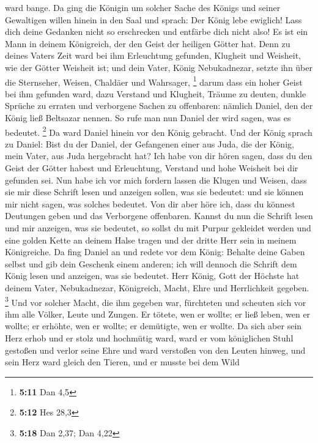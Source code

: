 ward bange.  Da ging die Königin um solcher Sache des
Königs und seiner Gewaltigen willen hinein in den Saal und sprach: Der
König lebe ewiglich! Lass dich deine Gedanken nicht so erschrecken und
entfärbe dich nicht also!  Es ist ein Mann in deinem
Königreich, der den Geist der heiligen Götter hat. Denn zu deines Vaters
Zeit ward bei ihm Erleuchtung gefunden, Klugheit und Weisheit, wie der
Götter Weisheit ist; und dein Vater, König Nebukadnezar, setzte ihn über
die Sternseher, Weisen, Chaldäer und Wahrsager, \footnote{\textbf{5:11}
  Dan 4,5}  darum dass ein hoher Geist bei ihm gefunden
ward, dazu Verstand und Klugheit, Träume zu deuten, dunkle Sprüche zu
erraten und verborgene Sachen zu offenbaren: nämlich Daniel, den der
König ließ Beltsazar nennen. So rufe man nun Daniel der wird sagen, was
es bedeutet. \footnote{\textbf{5:12} Hes 28,3}  Da ward
Daniel hinein vor den König gebracht. Und der König sprach zu Daniel:
Bist du der Daniel, der Gefangenen einer aus Juda, die der König, mein
Vater, aus Juda hergebracht hat?  Ich habe von dir hören
sagen, dass du den Geist der Götter habest und Erleuchtung, Verstand und
hohe Weisheit bei dir gefunden sei.  Nun habe ich vor
mich fordern lassen die Klugen und Weisen, dass sie mir diese Schrift
lesen und anzeigen sollen, was sie bedeutet: und sie können mir nicht
sagen, was solches bedeutet.  Von dir aber höre ich, dass
du könnest Deutungen geben und das Verborgene offenbaren. Kannst du nun
die Schrift lesen und mir anzeigen, was sie bedeutet, so sollst du mit
Purpur gekleidet werden und eine golden Kette an deinem Halse tragen und
der dritte Herr sein in meinem Königreiche.  Da fing
Daniel an und redete vor dem König: Behalte deine Gaben selbst und gib
dein Geschenk einem anderen; ich will dennoch die Schrift dem König
lesen und anzeigen, was sie bedeutet.  Herr König, Gott
der Höchste hat deinem Vater, Nebukadnezar, Königreich, Macht, Ehre und
Herrlichkeit gegeben. \footnote{\textbf{5:18} Dan 2,37; Dan 4,22}
 Und vor solcher Macht, die ihm gegeben war, fürchteten
und scheuten sich vor ihm alle Völker, Leute und Zungen. Er tötete, wen
er wollte; er ließ leben, wen er wollte; er erhöhte, wen er wollte; er
demütigte, wen er wollte.  Da sich aber sein Herz erhob
und er stolz und hochmütig ward, ward er vom königlichen Stuhl gestoßen
und verlor seine Ehre  und ward verstoßen von den Leuten
hinweg, und sein Herz ward gleich den Tieren, und er musste bei dem Wild
